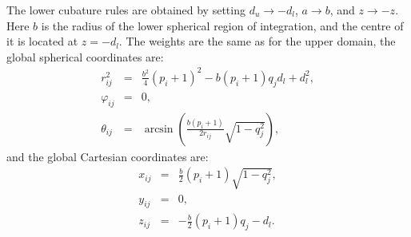 \documentclass[11pt]{amsart}
\begin{document}
The lower cubature rules are obtained by setting $d_u\rightarrow -d_l$,
$a\rightarrow b$, and $z\rightarrow-z$. Here $b$ is the radius of the lower
spherical region of integration, and the centre of it is located at $z=-d_l$.
The weights are the same as for the upper domain, the global spherical coordinates
are:
%
\begin{subequations}
\begin{eqnarray}
	r^2_{ij} & = & \frac{b^2}{4}(p_i+1)^2-b(p_i+1)q_jd_l+d_l^2,\\
	\varphi_{ij} & = & 0,\\
	\theta_{ij} & = & \arcsin\left(\frac{b(p_i+1)}{2r_{ij}}\sqrt{1-q_j^2}\right),
\end{eqnarray}
\end{subequations}
%
and the global Cartesian coordinates are:
%
\begin{subequations}
\begin{eqnarray}
	x_{ij} & = & \frac{b}{2}(p_i+1)\sqrt{1-q_j^2},\\
	y_{ij} & = & 0,\\
	z_{ij} & = & -\frac{b}{2}(p_i+1)q_j-d_l.
\end{eqnarray}
%
\end{subequations}
\end{document}
